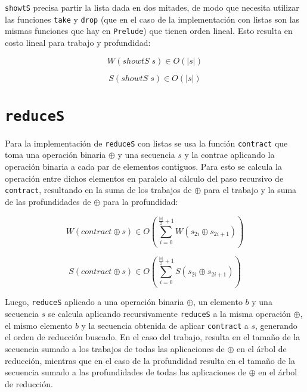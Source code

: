 \documentclass[a4paper,10pt]{article}
\begin{document}
\texttt{showtS} precisa partir la lista dada en dos mitades, de modo que necesita
utilizar las funciones \texttt{take} y \texttt{drop} (que en el caso de la
implementación con listas son las mismas funciones que hay en \texttt{Prelude})
que tienen orden lineal. Esto resulta en costo lineal para trabajo y profundidad:

\begin{equation*}
    W \left( showtS \; s \right) \in
    O \left( \vert s \vert \right)
\end{equation*}

\begin{equation*}
    S \left( showtS \; s \right) \in
    O \left( \vert s \vert \right)
\end{equation*}


\section*{\texttt{reduceS}}

Para la implementación de \texttt{reduceS} con listas se usa la función \texttt{contract}
que toma una operación binaria $\oplus$ y una secuencia $s$ y la contrae aplicando
la operación binaria a cada par de elementos contiguos. Para esto se calcula la
operación entre dichos elementos en paralelo al cálculo del paso recursivo de
\texttt{contract}, resultando en la suma de los trabajos de $\oplus$ para el trabajo
y la suma de las profundidades de $\oplus$ para la profundidad:

\begin{equation*}
    W \left( contract \oplus s \right) \in
    O \left( \sum_{i=0}^{\frac{\vert s \vert}{2} + 1} W \left( s_{2i} \oplus s_{2i+1} \right) \right)
\end{equation*}

\begin{equation*}
    S \left( contract \oplus s \right) \in
    O \left( \sum_{i=0}^{\frac{\vert s \vert}{2} + 1} S \left( s_{2i} \oplus s_{2i+1} \right) \right)
\end{equation*}

Luego, \texttt{reduceS} aplicado a una operación binaria $\oplus$, un elemento $b$
y una secuencia $s$ se calcula aplicando recursivamente \texttt{reduceS} a la
misma operación $\oplus$, el mismo elemento $b$ y la secuencia obtenida de aplicar
\texttt{contract} a $s$, generando el orden de reducción buscado. En el caso del
trabajo, resulta en el tamaño de la secuencia sumado a los trabajos de todas las
aplicaciones de $\oplus$ en el árbol de reducción, mientras que en el caso de la profundidad
resulta en el tamaño de la secuencia sumado a las profundidades de todas las
aplicaciones de $\oplus$ en el árbol de reducción.
\end{document}
